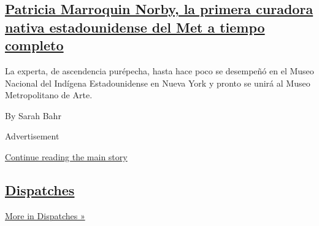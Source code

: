 \begin{enumerate}
{  \subsection{\texorpdfstring{\href{/es/2020/09/12/espanol/cultura/patricia-marroquin-norby-curadora-met.html}{Patricia
  Marroquin Norby, la primera curadora nativa estadounidense del Met a
  tiempo
  completo}}{Patricia Marroquin Norby, la primera curadora nativa estadounidense del Met a tiempo completo}}\label{patricia-marroquin-norby-la-primera-curadora-nativa-estadounidense-del-met-a-tiempo-completo}}

  La experta, de ascendencia purépecha, hasta hace poco se desempeñó en
  el Museo Nacional del Indígena Estadounidense en Nueva York y pronto
  se unirá al Museo Metropolitano de Arte.

  By Sarah Bahr
\end{enumerate}

Advertisement

\protect\hyperlink{after-mid2}{Continue reading the main story}

\hypertarget{dispatches}{%
\subsection{\texorpdfstring{\href{/spotlight/dispatches-international}{Dispatches}}{Dispatches}}\label{dispatches}}

\href{/spotlight/dispatches-international}{More in Dispatches »}


